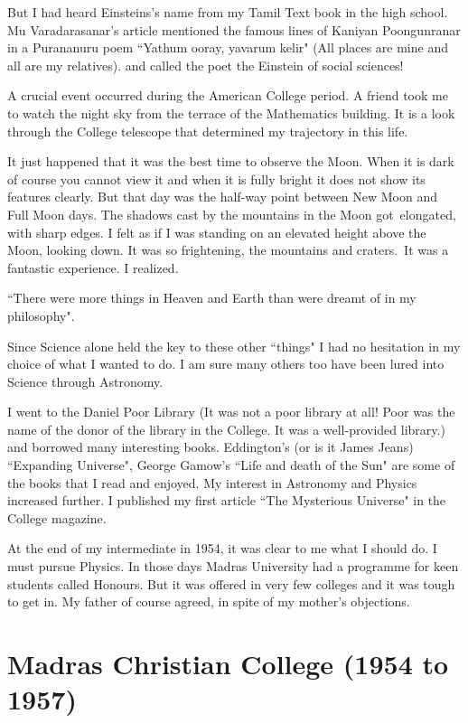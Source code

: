 But I had heard Einsteins's name from my Tamil Text book in the high 
school. Mu Varadarasanar's article mentioned the famous lines of Kaniyan 
Poongunranar in a Purananuru poem ``Yathum ooray, yavarum kelir"
(All places are mine and all are my relatives).
and called the poet the Einstein of social sciences!   


A crucial event occurred during the American College period. A friend 
took me to watch the night sky from the terrace\- of the Mathematics 
building. It is a look through the College telescope that determined my 
trajectory in this life.


It just happened that it was the best time to observe the Mo\-on. When it 
is dark of course you cannot view it and when it is fully bright it does 
not show its features clearly. But that day was the half-way point 
between New Moon and Full Moon days. The shadows cast by the mountains 
in the Moon got\ elongated, with sharp edges. I felt as if I was standing 
on an elevated height above the Moon, looking down. It was so 
frightening, the mountains and craters.\ It was a fantastic experience. I 
realized.


``There were more things in Heaven and Earth than were dreamt of in my 
philosophy".


Since Science alone held the key to these other ``things" I had no 
hesitation in my choice of what I wanted to do. I am sure many others 
too have been lured into Science through Astro\-nomy.
\vskip 1pt

I went to the Daniel Poor Library (It was not a poor library at all! 
Poor was the name of the donor of the library in the Co\-llege. It was a 
well-provided library.) and borrowed many inte\-resting books. Eddington's 
(or is it James Jeans) ``Expanding Universe", George Gamow's ``Life and 
death of the Sun" are some of the books that I read and enjoyed. My 
interest in Astronomy and Physics increased further. I published my 
first article ``The Mysterious Universe" in the College magazine.

At the end of my intermediate in 1954, it was clear to me what I should 
do. I must pursue Physics. In those days Madras University had a 
programme for keen students called Honours. But it was offered in very 
few colleges and it was tough to get in. My father of course agreed, 
in spite of my mother's objections.

\section*{Madras Christian College (1954 to 1957)}

